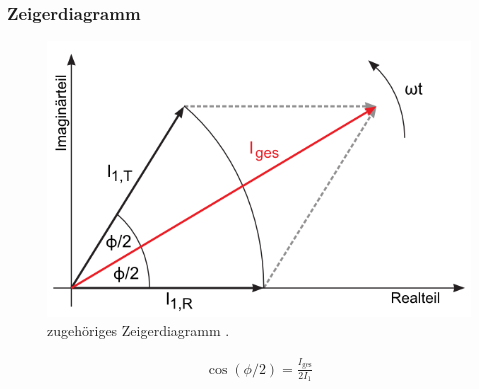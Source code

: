 \documentclass[12pt,a4paper,titlepage,headinclude,bibtotoc]{scrartcl}
\begin{document}
\subsubsection{Zeigerdiagramm}
\begin{figure}[!htb]
	\centering
	\includegraphics[scale=0.8]{Zeigerdiagramm.png}
	\caption{zugehöriges Zeigerdiagramm \cite[Datum: 01.09.2014]{LP16}.}
\end{figure}
\begin{align}
	\cos(\phi/2)=\frac{I_\text{ges}}{2I_1}
	\label{eq:zeigerdiagramm}
\end{align}
\end{document}
